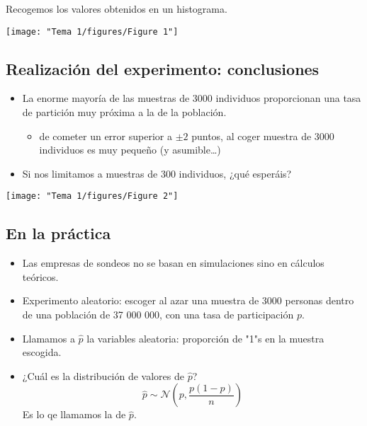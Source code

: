 Recogemos los valores obtenidos en un histograma.

\begin{center}
\texttt{[image: "Tema 1/figures/Figure 1"]}
\end{center}

\subsection{Realización del experimento: conclusiones}
\begin{itemize}[label=\textbullet]
  \item La enorme mayoría de las muestras de 3000 individuos proporcionan una tasa de partición muy próxima a la de la población.
    \begin{itemize}[label=\textrightarrow]
      \item \textbf{} de cometer un error superior a $\pm 2$ puntos, al coger \textbf{} muestra de 3000 individuos es muy pequeño (y asumible\dots)
    \end{itemize}
    \item Si nos limitamos a muestras de 300 individuos, ¿qué esperáis?
\end{itemize}
\begin{center}
  \texttt{[image: "Tema 1/figures/Figure 2"]}
\end{center}
\subsection{En la práctica}
\begin{tcolorbox}[colback=blue!5!white, colframe=blue!75!black, title=\textbf{Usamos las distribuciones muestrales}]
\begin{itemize}[label=\textbullet]
  \item Las empresas de sondeos no se basan en simulaciones sino en cálculos teóricos.
  \item Experimento aleatorio: escoger al azar una muestra de 3000 personas dentro de una población de 37 000 000, con una tasa de participación $p$.
  \item Llamamos a  $\hat{p}$ la variables aleatoria: proporción de "1"s en la muestra escogida.
  \item ¿Cuál es la distribución de valores de $\hat{p}$? \[
  \hat{p}\sim \mathcal{N}\left( p,\dfrac{p(1-p)}{n} \right) 
  \] 
  Es lo qe llamamos la  de $\hat{p}$.
\end{itemize}
\end{tcolorbox}
